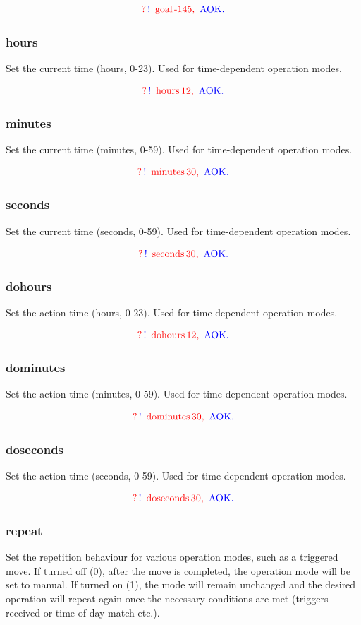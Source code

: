 \documentclass[10pt]{article}
\newcommand{\exchange}[2]{
\begin{equation}
 \nonumber \textcolor{red}{?} \, \textcolor{blue}{!} \, \textcolor{red}{\text { #1}} \,\textcolor{red}{\text{#2, }} \, \textcolor{blue}{\text{AOK.}}
 \end{equation}
}
\begin{document}
\exchange{goal}{-145}

\subsubsection{hours}
\label{hours}
Set the current time (hours, 0-23).  Used for time-dependent operation modes.

\exchange{hours}{12}

\subsubsection{minutes}
\label{minutes}
Set the current time (minutes, 0-59). Used for time-dependent operation modes.

\exchange{minutes}{30}

\subsubsection{seconds}
\label{seconds}
Set the current time (seconds, 0-59). Used for time-dependent operation modes.

\exchange{seconds}{30}

\subsubsection{dohours}
\label{dohours}
Set the action time (hours, 0-23).  Used for time-dependent operation modes.

\exchange{dohours}{12}

\subsubsection{dominutes}
\label{dominutes}
Set the action time (minutes, 0-59). Used for time-dependent operation modes.

\exchange{dominutes}{30}

\subsubsection{doseconds}
\label{doseconds}
Set the action time (seconds, 0-59). Used for time-dependent operation modes.

\exchange{doseconds}{30}

\subsubsection{repeat}
\label{repeat}
Set the repetition behaviour for various operation modes, such as a triggered move. If turned off (0), after the move is completed, the operation mode will be set to manual.  If turned on (1), the mode will remain unchanged and the desired operation will repeat again once the necessary conditions are met (triggers received or time-of-day match etc.). 
\end{document}
